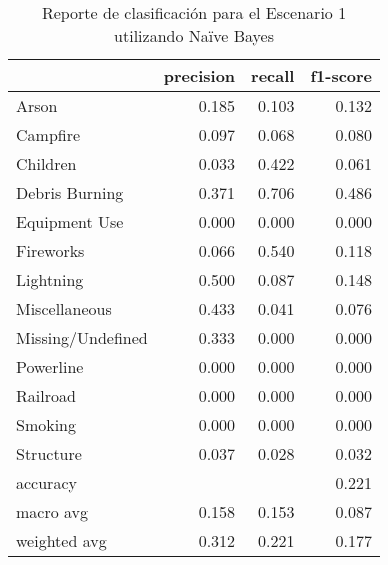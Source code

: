 \begin{table}
\centering
\caption{Reporte de clasificación para el Escenario 1 utilizando Naïve Bayes}
\label{tab:NB_Escenario 1}
\begin{tabular}{lrrr}
\toprule
{} &  precision &  recall &  f1-score \\
\midrule
Arson             &      0.185 &   0.103 &     0.132 \\
Campfire          &      0.097 &   0.068 &     0.080 \\
Children          &      0.033 &   0.422 &     0.061 \\
Debris Burning    &      0.371 &   0.706 &     0.486 \\
Equipment Use     &      0.000 &   0.000 &     0.000 \\
Fireworks         &      0.066 &   0.540 &     0.118 \\
Lightning         &      0.500 &   0.087 &     0.148 \\
Miscellaneous     &      0.433 &   0.041 &     0.076 \\
Missing/Undefined &      0.333 &   0.000 &     0.000 \\
Powerline         &      0.000 &   0.000 &     0.000 \\
Railroad          &      0.000 &   0.000 &     0.000 \\
Smoking           &      0.000 &   0.000 &     0.000 \\
Structure         &      0.037 &   0.028 &     0.032 \\
accuracy          &            &         &     0.221 \\
macro avg         &      0.158 &   0.153 &     0.087 \\
weighted avg      &      0.312 &   0.221 &     0.177 \\
\bottomrule
\end{tabular}
\end{table}

